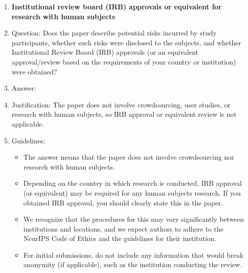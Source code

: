 \documentclass{article}
\theoremstyle{definition}
\theoremstyle{remark}
\theoremstyle{remark}
\begin{document}
\begin{enumerate}
\item {\bf Institutional review board (IRB) approvals or equivalent for research with human subjects}
    \item[] Question: Does the paper describe potential risks incurred by study participants, whether such risks were disclosed to the subjects, and whether Institutional Review Board (IRB) approvals (or an equivalent approval/review based on the requirements of your country or institution) were obtained?
    \item[] Answer: \answerNA{} %
    \item[] Justification: The paper does not involve crowdsourcing, user studies, or research with human subjects, so IRB approval or equivalent review is not applicable.
    \item[] Guidelines:
    \begin{itemize}
        \item The answer \answerNA{} means that the paper does not involve crowdsourcing nor research with human subjects.
        \item Depending on the country in which research is conducted, IRB approval (or equivalent) may be required for any human subjects research. If you obtained IRB approval, you should clearly state this in the paper. 
        \item We recognize that the procedures for this may vary significantly between institutions and locations, and we expect authors to adhere to the NeurIPS Code of Ethics and the guidelines for their institution. 
        \item For initial submissions, do not include any information that would break anonymity (if applicable), such as the institution conducting the review.
    \end{itemize}


\end{enumerate}
\end{document}
